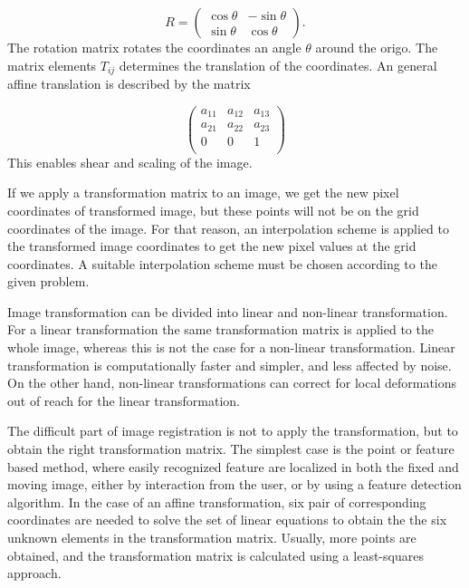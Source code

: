 \begin{equation}
	R = 
	\begin{pmatrix}
	\cos \theta & -\sin \theta\\
	\sin \theta & \cos \theta
	\end{pmatrix}.
\end{equation}
The rotation matrix rotates the coordinates an angle $\theta$ around the origo. The matrix elements $T_{ij}$ determines the translation of the coordinates. An general affine translation is described by the matrix

\begin{equation}
\begin{pmatrix}
 a_{11}&a_{12}&a_{13}\\
 a_{21}&a_{22}&a_{23}\\
 0&0&1\\
 
\end{pmatrix}
\end{equation} 
This enables shear and scaling of the image.

If we apply a transformation matrix to an image, we get the new pixel coordinates of transformed image, but these points will not be on the grid coordinates of the image. For that reason, an interpolation scheme is applied to the transformed image coordinates to get the new pixel values at the grid coordinates. A suitable interpolation scheme must be chosen according to the given problem.

Image transformation can be divided into linear and non-linear transformation. For a linear transformation the same transformation matrix is applied to the whole image, whereas this is not the case for a non-linear transformation. Linear transformation is computationally faster and simpler, and less affected by noise. On the other hand, non-linear transformations can correct for local deformations out of reach for the linear transformation. 

The difficult part of image registration is not to apply the transformation, but to obtain the right transformation matrix. The simplest case is the point or feature based method, where easily recognized feature are localized in both the fixed and moving image, either by interaction from the user, or by using a feature detection algorithm. In the case of an affine transformation, six pair of corresponding coordinates are needed to solve the set of linear equations to obtain the the six unknown elements in the transformation matrix. Usually, more points are obtained, and the transformation matrix is calculated using a least-squares approach. 

